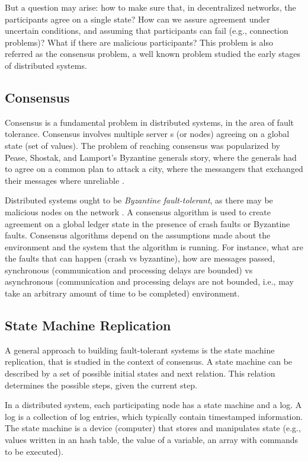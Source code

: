 \documentclass[12pt,a4paper]{article}
\begin{document}

But a question may arise: how to make sure that, in decentralized networks, the participants agree on a single state? How can we assure agreement under uncertain conditions, and assuming that participants can fail (e.g., connection problems)? What if there are malicious participants? This problem is also referred as the consensus problem, a well known problem studied the early stages of distributed systems.


\subsection{Consensus}
Consensus is a fundamental problem in distributed systems, in the area of fault tolerance. Consensus involves multiple server s (or nodes) agreeing on a global state (set of values). %
The problem of reaching consensus was popularized by Pease, Shostak, and Lamport's Byzantine generals story, where the generals had to agree on a common plan to attack a city, where the messangers that exchanged their messages where unreliable \cite{byzantine_generals}.  

Distributed systems ought to be \emph{Byzantine fault-tolerant}, as there may be malicious nodes on the network \cite{correia2019byzantine}.  A consensus algorithm is used to create agreement on a global ledger state in the presence of crash faults or Byzantine faults. Consensus algorithms depend on the assumptions made about the environment and the system that the algorithm is running. For instance, what are the faults that can happen (crash vs byzantine), how are messages passed, synchronous (communication and processing delays are bounded) vs asynchronous (communication and processing delays are not bounded, i.e., may take an arbitrary amount of time to be completed) environment.

\subsection{State Machine Replication}
A general approach to building fault-tolerant systems is the state machine replication, that is studied in the context of consensus.  A state machine can be described by a set of possible initial states and next relation. This relation determines the possible steps, given the current step.

In a distributed system, each participating node has a state machine and a log. A log is a collection of log entries, which typically contain timestamped information. The state machine is a device (computer) that stores and manipulates state (e.g., values written in an hash table, the value of a variable, an array with commands to be executed). 
\end{document}
